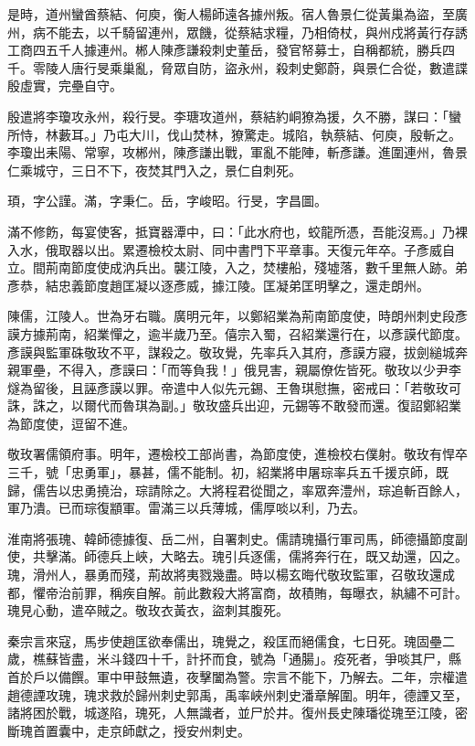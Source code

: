 \begin{pinyinscope}
 是時，道州蠻酋蔡結、何庾，衡人楊師遠各據州叛。宿人魯景仁從黃巢為盜，至廣州，病不能去，以千騎留連州，眾饑，從蔡結求糧，乃相倚杖，與州戍將黃行存誘工商四五千人據連州。郴人陳彥謙殺刺史董岳，發官帑募士，自稱都統，勝兵四千。零陵人唐行旻乘巢亂，脅眾自防，盜永州，殺刺史鄭蔚，與景仁合從，數遣諜殷虛實，完壘自守。



 殷遣將李瓊攻永州，殺行旻。李瑭攻道州，蔡結約峒獠為援，久不勝，謀曰：「蠻所恃，林藪耳。」乃屯大川，伐山焚林，獠驚走。城陷，執蔡結、何庾，殷斬之。李瓊出耒陽、常寧，攻郴州，陳彥謙出戰，軍亂不能陣，斬彥謙。進圍連州，魯景仁乘城守，三日不下，夜焚其門入之，景仁自刺死。



 頊，字公謹。滿，字秉仁。岳，字峻昭。行旻，字昌圖。



 滿不修飭，每宴使客，抵寶器潭中，曰：「此水府也，蛟龍所憑，吾能沒焉。」乃裸入水，俄取器以出。累遷檢校太尉、同中書門下平章事。天復元年卒。子彥威自立。間荊南節度使成汭兵出。襲江陵，入之，焚樓船，殘墟落，數千里無人跡。弟彥恭，結忠義節度趙匡凝以逐彥威，據江陵。匡凝弟匡明擊之，還走朗州。



 陳儒，江陵人。世為牙右職。廣明元年，以鄭紹業為荊南節度使，時朗州刺史段彥謨方據荊南，紹業憚之，逾半歲乃至。僖宗入蜀，召紹業還行在，以彥謨代節度。彥謨與監軍硃敬玫不平，謀殺之。敬玫覺，先率兵入其府，彥謨方寢，拔劍縋城奔親軍壘，不得入，彥謨曰：「而等負我！」俄見害，親屬僚佐皆死。敬玫以少尹李燧為留後，且誣彥謨以罪。帝遣中人似先元錫、王魯琪慰撫，密戒曰：「若敬玫可誅，誅之，以爾代而魯琪為副。」敬玫盛兵出迎，元錫等不敢發而還。復詔鄭紹業為節度使，逗留不進。



 敬玫署儒領府事。明年，遷檢校工部尚書，為節度使，進檢校右僕射。敬玫有悍卒三千，號「忠勇軍」，暴甚，儒不能制。初，紹業將申屠琮率兵五千援京師，既歸，儒告以忠勇撓治，琮請除之。大將程君從聞之，率眾奔澧州，琮追斬百餘人，軍乃潰。已而琮復顓軍。雷滿三以兵薄城，儒厚啖以利，乃去。



 淮南將張瑰、韓師德據復、岳二州，自署刺史。儒請瑰攝行軍司馬，師德攝節度副使，共擊滿。師德兵上峽，大略去。瑰引兵逐儒，儒將奔行在，既又劫還，囚之。瑰，滑州人，暴勇而殘，荊故將夷戮幾盡。時以楊玄晦代敬玫監軍，召敬玫還成都，懼帝治前罪，稱疾自解。前此數殺大將富商，故積賄，每曝衣，紈繡不可計。瑰見心動，遣卒賊之。敬玫衣黃衣，盜刺其腹死。



 秦宗言來寇，馬步使趙匡欲奉儒出，瑰覺之，殺匡而絕儒食，七日死。瑰固壘二歲，樵蘇皆盡，米斗錢四十千，計抔而食，號為「通腸」。疫死者，爭啖其尸，縣首於戶以備饌。軍中甲鼓無遺，夜擊闔為警。宗言不能下，乃解去。二年，宗權遣趙德諲攻瑰，瑰求救於歸州刺史郭禹，禹率峽州刺史潘章解圍。明年，德諲又至，諸將困於戰，城遂陷，瑰死，人無識者，並尸於井。復州長史陳璠從瑰至江陵，密斷瑰首置囊中，走京師獻之，授安州刺史。




\end{pinyinscope}
